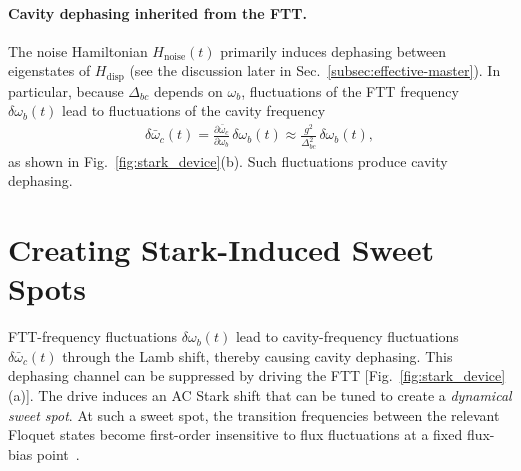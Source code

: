\paragraph{Cavity dephasing inherited from the FTT.} The noise Hamiltonian \(H_{\mathrm{noise}}(t)\) primarily induces dephasing between eigenstates of \(H_\text{disp}\) (see the discussion later in Sec.~\ref{subsec:effective-master}). In particular, because \(\Delta_{bc}\) depends on \(\omega_b\), fluctuations of the FTT frequency \(\delta\omega_b(t)\) lead to fluctuations of the cavity frequency 
\begin{align}
\delta\bar{\omega}_c(t)
= \frac{\partial \bar{\omega}_c}{\partial \omega_b}\,\delta\omega_b(t)
\approx \frac{g^2}{\Delta_{bc}^2}\,\delta\omega_b(t),
\end{align}
as shown in Fig.~\ref{fig:stark_device}(b). Such fluctuations produce cavity dephasing.

\section{Creating Stark-Induced Sweet Spots}
\label{sec:creating-stark-sweet-spots}

FTT-frequency fluctuations \(\delta\omega_b(t)\) lead to cavity-frequency fluctuations \(\delta\bar{\omega}_c(t)\) through the Lamb shift, thereby causing cavity dephasing. This dephasing channel can be suppressed by driving the FTT [Fig.~\ref{fig:stark_device}(a)]. The drive induces an AC Stark shift that can be tuned to create a \emph{dynamical sweet spot}. At such a sweet spot, the transition frequencies between the relevant Floquet states become first-order insensitive to flux fluctuations at a fixed flux-bias point~\cite{Huang2021DynamicalSweetSpots,PhysRevApplied.12.054015dss2}.


